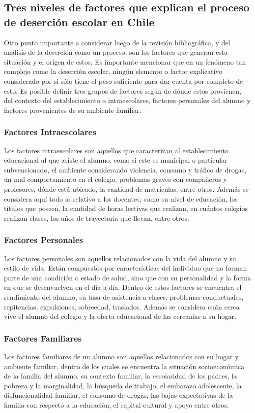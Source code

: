 \subsection{Tres niveles de factores que explican el proceso de deserción escolar en Chile}
Otro punto importante a considerar luego de la revisión bibliográfica, y del análisis de la deserción como un proceso, son los factores que generan esta situación y el orígen de estos. Es importante mencionar que en un fenómeno tan complejo como la deserción escolar, ningún elemento o factor explicativo considerado por si sólo tiene el peso suficiente para dar cuenta por completo de esto. 
Es posible definir tres grupos de factores según de dónde estos provienen, del contexto del establecimiento o intraescolares, factores personales del alumno y factores provenientes de su ambiente familiar. 
\subsubsection{Factores Intraescolares}
Los factores intraescolares son aquellos que caracterizan al establecimiento educacional al que asiste el alumno, como si este es municipal o particular subvencionado, el ambiente considerando violencia, consumo y tráfico de drogas, un mal comportamiento en el colegio, problemas graves con compañeros y profesores, dónde está ubicado, la cantidad de matrículas, entre otros.  Además se considera aquí todo lo relativo a los docentes; como su nivel de educación, los títulos que poseen, la cantidad de horas lectivas que realizan, en cuántos colegios realizan clases, los años de trayectoria que llevan, entre otros. 
\subsubsection{Factores Personales}
Los factores personales son aquellos relacionados con la vida del alumno y su estilo de vida. Están compuestos por características del individuo que no forman parte de una condición o estado de salud, sino que con su personalidad y la forma en que se desenvuelven en el día a día. 
Dentro de estos factores se encuentra el rendimiento del alumno, su tasa de asistencia a clases, problemas conductuales, repitencias, expulsiones, sobreedad, traslados. Además se considera cuán cerca vive el alumno del colegio y la oferta educacional de las cercanías a su hogar. 
\subsubsection{Factores Familiares}
Los factores familiares de un alumno son aquellos relacionados con su hogar y ambiente familiar, dentro de los cuales se encuentra la situación socioeconómica de la familia del alumno, su contexto familiar, la escolaridad de los padres, la pobreza y la marginalidad, la búsqueda de trabajo, el embarazo adolescente, la disfuncionalidad familiar, el consumo de drogas, las bajas expectativas de la familia con respecto a la educación, el capital cultural y apoyo entre otros.

